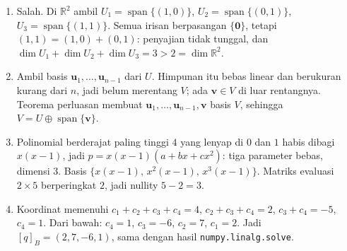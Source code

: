 \begin{enumerate}[label=\textbf{6.\arabic*}]
  \item Salah. Di $\mathbb{R}^{2}$ ambil $U_{1}=\operatorname{span}\{(1,0)\}$,
        $U_{2}=\operatorname{span}\{(0,1)\}$, $U_{3}=\operatorname{span}\{(1,1)\}$.
        Semua irisan berpasangan $\{\mathbf{0}\}$, tetapi
        $(1,1)=(1,0)+(0,1)$: penyajian tidak tunggal, dan
        $\dim U_{1}+\dim U_{2}+\dim U_{3}=3>2=\dim\mathbb{R}^{2}$.

  \item Ambil basis $\mathbf{u}_{1},\dots,\mathbf{u}_{n-1}$ dari $U$. Himpunan itu
        bebas linear dan berukuran kurang dari $n$, jadi belum merentang $V$;
        ada $\mathbf{v}\in V$ di luar rentangnya. Teorema perluasan membuat
        $\mathbf{u}_{1},\dots,\mathbf{u}_{n-1},\mathbf{v}$ basis $V$, sehingga
        $V=U\oplus\operatorname{span}\{\mathbf{v}\}$.

  \item Polinomial berderajat paling tinggi $4$ yang lenyap di $0$ dan $1$ habis
        dibagi $x(x-1)$, jadi $p=x(x-1)(a+bx+cx^{2})$: tiga parameter bebas,
        dimensi $3$. Basis $\{x(x-1),\,x^{2}(x-1),\,x^{3}(x-1)\}$. Matriks
        evaluasi $2\times5$ berperingkat $2$, jadi nullity $5-2=3$.

  \item Koordinat memenuhi $c_{1}+c_{2}+c_{3}+c_{4}=4$, $c_{2}+c_{3}+c_{4}=2$,
        $c_{3}+c_{4}=-5$, $c_{4}=1$. Dari bawah: $c_{4}=1$, $c_{3}=-6$,
        $c_{2}=7$, $c_{1}=2$. Jadi $[q]_{B}=(2,7,-6,1)$, sama dengan hasil
        \texttt{numpy.linalg.solve}.
\end{enumerate}

